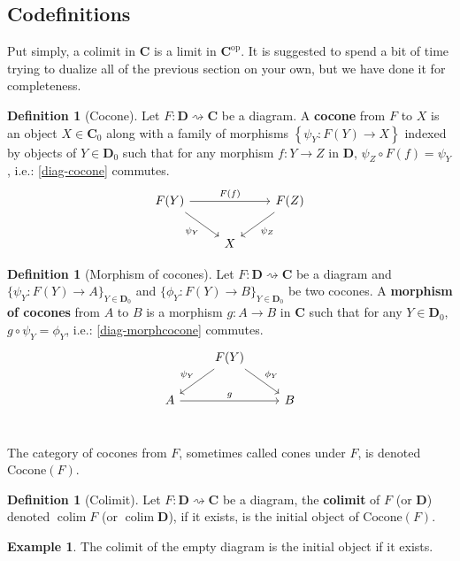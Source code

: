 \documentclass{article}
\theoremstyle{definition}
\newtheorem{defn}[thm]{Definition}
\newtheorem{exmp}[thm]{Example}
\theoremstyle{remark}
\DeclareMathOperator*{\colim}{co{\lim}}
\newcommand{\op}[1]{#1^{\text{op}}}
\begin{document}
\subsection{Codefinitions}
Put simply, a colimit in $\mathbf{C}$ is a limit in $\op{\mathbf{C}}$.  It is suggested to spend a bit of time trying to dualize all of the previous section on your own, but we have done it for completeness.  
\begin{defn}[Cocone]
    Let $F: \mathbf{D}\rightsquigarrow \mathbf{C}$ be a diagram. A \textbf{cocone} from $F$ to $X$ is an object $X \in \mathbf{C}_0$ along with a family of morphisms $\left\{ \psi_Y: F(Y) \rightarrow X \right\}$ indexed by objects of $Y \in \mathbf{D}_0$ such that for any morphism $f:Y \rightarrow Z$ in $\mathbf{D}$, $\psi_Z \circ F(f) = \psi_Y$, i.e.: \eqref{diag-cocone} commutes.
    \begin{equation}\label{diag-cocone}
        \begin{tikzcd}
            F(Y) \arrow[rd, "\psi_Y"'] \arrow[rr, "F(f)"] & & F(Z) \arrow[ld, "\psi_Z"]\\
            & X & 
        \end{tikzcd}
    \end{equation}
\end{defn}
\begin{defn}[Morphism of cocones]
    Let $F:\mathbf{D}\rightsquigarrow \mathbf{C}$ be a diagram and $\{\psi_Y: F(Y)\rightarrow A \}_{Y \in \mathbf{D}_0}$ and $\{\phi_Y: F(Y)\rightarrow B\}_{Y \in \mathbf{D}_0}$ be two cocones. A \textbf{morphism of cocones} from $A$ to $B$ is a morphism $g:A\rightarrow B$ in $\mathbf{C}$ such that for any $Y\in \mathbf{D}_0$, $g \circ \psi_Y = \phi_Y$, i.e.: \eqref{diag-morphcocone} commutes.
    \begin{equation}\label{diag-morphcocone}
        \begin{tikzcd}
            & F(Y) \arrow[ld, "\psi_Y"'] \arrow[rd, "\phi_Y"] & \\
            A \arrow[rr, "g"] &  & B  \\
        \end{tikzcd}
    \end{equation}
\end{defn}
The category of cocones from $F$, sometimes called cones under $F$, is denoted $\text{Cocone}(F)$.
\begin{defn}[Colimit]
    Let $F:\mathbf{D} \rightsquigarrow \mathbf{C}$ be a diagram, the \textbf{colimit} of $F$ (or $\mathbf{D}$) denoted $\colim F$ (or $\colim\mathbf{D}$), if it exists, is the initial object of $\text{Cocone}(F)$.
\end{defn}
\begin{exmp}
    The colimit of the empty diagram is the initial object if it exists.
\end{exmp}
\end{document}
